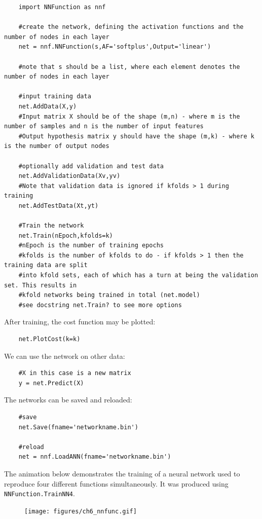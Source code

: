 	\begin{verbatim}
	import NNFunction as nnf
	
	#create the network, defining the activation functions and the number of nodes in each layer
	net = nnf.NNFunction(s,AF='softplus',Output='linear')
	
	#note that s should be a list, where each element denotes the number of nodes in each layer
	
	#input training data
	net.AddData(X,y)
	#Input matrix X should be of the shape (m,n) - where m is the number of samples and n is the number of input features
	#Output hypothesis matrix y should have the shape (m,k) - where k is the number of output nodes
	
	#optionally add validation and test data
	net.AddValidationData(Xv,yv)
	#Note that validation data is ignored if kfolds > 1 during training
	net.AddTestData(Xt,yt)
	
	#Train the network 
	net.Train(nEpoch,kfolds=k)
	#nEpoch is the number of training epochs
	#kfolds is the number of kfolds to do - if kfolds > 1 then the training data are split 
	#into kfold sets, each of which has a turn at being the validation set. This results in
	#kfold networks being trained in total (net.model)
	#see docstring net.Train? to see more options
	\end{verbatim}
	
	After training, the cost function may be plotted:
	
	\begin{verbatim}
	net.PlotCost(k=k)
	\end{verbatim}
	
	We can use the network on other data:
	
	\begin{verbatim}
	#X in this case is a new matrix
	y = net.Predict(X)
	\end{verbatim}
	
	The networks can be saved and reloaded:
	
	\begin{verbatim}
	#save
	net.Save(fname='networkname.bin')
	
	#reload
	net = nnf.LoadANN(fname='networkname.bin')
	\end{verbatim}
	
	The animation below demonstrates the training of a neural network used to reproduce four different functions simultaneously. It was produced using \texttt{NNFunction.TrainNN4}.
	
	\begin{figure}[H]
	  \centering
	  \texttt{[image: figures/ch6\_nnfunc.gif]}
	\end{figure}




